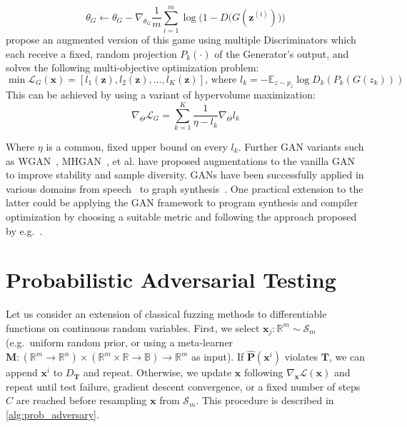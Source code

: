 \begin{equation}
\theta_G \leftarrow \theta_G - \nabla_{\theta_G}\frac{1}{m}\sum_{i=1}^m \log\Big(1 - D\big(G(\mathbf z^{(i)})\big)\Big)
\end{equation}
%
\citet{albuquerque2019hgan} propose an augmented version of this game using multiple Discriminators which each receive a fixed, random projection $P_k(\cdot)$ of the Generator's output, and solves the following multi-objective optimization problem:
%
\begin{equation}
\min \mathbf{\mathcal{L}}_G(\mathbf x) = \left[l_1(\mathbf z), l_2(\mathbf z), \ldots, l_K(\mathbf z)\right] \text{, where } l_k = -\mathbb E_{z \sim p_z} \log D_k(P_k(G(z_k)))
\end{equation}
%
This can be achieved by using a variant of hypervolume maximization:
%
\begin{equation}
\nabla_\Theta \mathcal{L}_G = \sum_{k=1}^K \frac{1}{\eta - l_k}\nabla_\Theta l_k
\end{equation}

Where $\eta$ is a common, fixed upper bound on every $l_k$. Further GAN variants such as WGAN~\citep{arjovsky2017wgan}, MHGAN~\citep{turner2019mhgan}, et al. have proposed augmentations to the vanilla GAN to improve stability and sample diversity. GANs have been successfully applied in various domains from speech~\citep{donahue2019wavegan} to graph synthesis~\citep{wang2018graphgan}. One practical extension to the latter could be applying the GAN framework to program synthesis and compiler optimization by choosing a suitable metric and following the approach proposed by e.g.~\citet{adams2019learning, mendis2019compiler}.
%
\section{Probabilistic Adversarial Testing}

%
%

Let us consider an extension of classical fuzzing methods to differentiable functions on continuous random variables. First, we select $\mathbf{x}_j: \mathbb{R}^m \sim \mathcal S_m$ (e.g.\ uniform random prior, or using a meta-learner $\mathbf M: (\mathbb{R}^m \rightarrow \mathbb{R}^n) \times (\mathbb{R}^m \times \mathbb R \rightarrow \mathbb B) \rightarrow \mathbb{R}^m$ as input). If $\mathbf{\hat P}(\mathbf{x}^i)$ violates $\mathbf T$, we can append $\mathbf x^i$ to $D_\mathbf T$ and repeat. Otherwise, we update $\mathbf x$ following $\nabla_{\mathbf x}\mathcal{L}(\mathbf{x})$ and repeat until test failure, gradient descent convergence, or a fixed number of steps $C$ are reached before resampling $\mathbf{x}$ from $\mathcal S_m$. This procedure is described in \autoref{alg:prob_adversary}.

